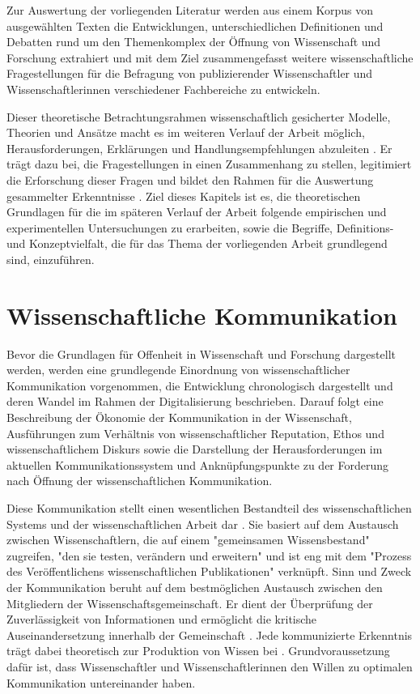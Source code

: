 Zur Auswertung der vorliegenden Literatur werden aus einem Korpus von ausgewählten Texten die Entwicklungen, unterschiedlichen Definitionen und Debatten rund um den Themenkomplex der Öffnung von Wissenschaft und Forschung extrahiert und mit dem Ziel zusammengefasst weitere wissenschaftliche Fragestellungen für die Befragung von publizierender Wissenschaftler und Wissenschaftlerinnen verschiedener Fachbereiche zu entwickeln.

Dieser theoretische Betrachtungsrahmen wissenschaftlich gesicherter Modelle, Theorien und Ansätze macht es im weiteren Verlauf der Arbeit möglich, Herausforderungen, Erklärungen und Handlungsempfehlungen abzuleiten \cite{martin_2007_wissenschaftstheorie}. Er trägt dazu bei, die Fragestellungen in einen Zusammenhang zu stellen, legitimiert die Erforschung dieser Fragen und bildet den Rahmen für die Auswertung gesammelter Erkenntnisse \cite{suchen}. Ziel dieses Kapitels ist es, die theoretischen Grundlagen für die im späteren Verlauf der Arbeit folgende empirischen und experimentellen Untersuchungen zu erarbeiten, sowie die Begriffe,  Definitions- und Konzeptvielfalt, die für das Thema der vorliegenden Arbeit grundlegend sind, einzuführen.

\section{Wissenschaftliche Kommunikation}

Bevor die Grundlagen für Offenheit in Wissenschaft und Forschung dargestellt werden, werden eine grundlegende Einordnung von wissenschaftlicher Kommunikation vorgenommen, die Entwicklung chronologisch dargestellt und deren Wandel im Rahmen der Digitalisierung beschrieben. Darauf folgt eine Beschreibung der Ökonomie der Kommunikation in der Wissenschaft, Ausführungen zum Verhältnis von wissenschaftlicher Reputation, Ethos und wissenschaftlichem Diskurs sowie die Darstellung der Herausforderungen im aktuellen Kommunikationssystem und Anknüpfungspunkte zu der Forderung nach Öffnung der wissenschaftlichen Kommunikation.

Diese Kommunikation stellt einen wesentlichen Bestandteil des wissenschaftlichen Systems und der wissenschaftlichen Arbeit dar \cite{garvey_2014_communication} \cite[:63]{Luhmann1998}. Sie basiert auf dem Austausch zwischen Wissenschaftlern, die auf einem "gemeinsamen Wissensbestand" zugreifen, "den sie testen, verändern und erweitern" \cite{Gl_ser_2007} und ist eng mit dem "Prozess des Veröffentlichens wissenschaftlichen Publikationen" \cite{weller2011twitter} verknüpft. Sinn und Zweck der Kommunikation beruht auf dem bestmöglichen Austausch zwischen den Mitgliedern der Wissenschaftsgemeinschaft. Er dient der Überprüfung der Zuverlässigkeit von Informationen und ermöglicht die kritische Auseinandersetzung innerhalb der Gemeinschaft \cite{fox_1983_publication}. Jede kommunizierte Erkenntnis trägt dabei theoretisch zur Produktion von Wissen bei \cite{kaden_2009_library}. Grundvoraussetzung dafür ist, dass Wissenschaftler und Wissenschaftlerinnen den Willen zu optimalen Kommunikation untereinander haben.

